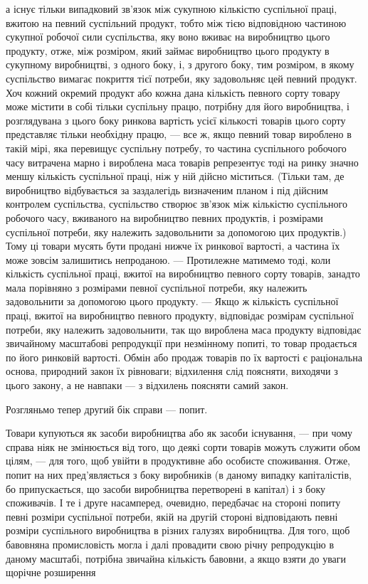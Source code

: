 \enlargethispage{\baselineskip}
\parcont{}  %
а існує тільки випадковий зв’язок між сукупною кількістю суспільної
праці, вжитою на певний суспільний продукт, тобто між
тією відповідною частиною сукупної робочої сили суспільства,
яку воно вживає на виробництво цього продукту, отже, між
розміром, який займає виробництво цього продукту в сукупному
виробництві, з одного боку, і, з другого боку, тим розміром, в якому
суспільство вимагає покриття тієї потреби, яку задовольняє цей
певний продукт. Хоч кожний окремий продукт або кожна дана кількість
певного сорту товару може містити в собі тільки суспільну
працю, потрібну для його виробництва, і розглядувана з цього
боку ринкова вартість усієї кількості товарів цього сорту представляє
тільки необхідну працю, — все ж, якщо певний товар
вироблено в такій мірі, яка перевищує суспільну потребу, то
частина суспільного робочого часу витрачена марно і вироблена
маса товарів репрезентує тоді на ринку значно меншу
кількість суспільної праці, ніж у ній дійсно міститься. (Тільки
там, де виробництво відбувається за заздалегідь визначеним
планом і під дійсним контролем суспільства, суспільство створює
зв’язок між кількістю суспільного робочого часу, вживаного на виробництво
певних продуктів, і розмірами суспільної потреби, яку
належить задовольнити за допомогою цих продуктів.) Тому ці товари
мусять бути продані нижче їх ринкової вартості, а частина їх
може зовсім залишитись непроданою. — Протилежне матимемо тоді,
коли кількість суспільної праці, вжитої на виробництво певного
сорту товарів, занадто мала порівняно з розмірами певної суспільної
потреби, яку належить задовольнити за допомогою цього продукту.
— Якщо ж кількість суспільної праці, вжитої на виробництво
певного продукту, відповідає розмірам суспільної потреби, яку
належить задовольнити, так що вироблена маса продукту відповідає
звичайному масштабові репродукції при незмінному
попиті, то товар продається по його ринковій вартості. Обмін
або продаж товарів по їх вартості є раціональна основа, природний
закон їх рівноваги; відхилення слід поясняти, виходячи
з цього закону, а не навпаки — з відхилень поясняти самий закон.

Розгляньмо тепер другий бік справи — попит.

Товари купуються як засоби виробництва або як засоби
існування, — при чому справа ніяк не змінюється від того, що
деякі сорти товарів можуть служити обом цілям, — для того,
щоб увійти в продуктивне або особисте споживання. Отже,
попит на них пред’являється з боку виробників (в даному випадку
капіталістів, бо припускається, що засоби виробництва
перетворені в капітал) і з боку споживачів. І те і друге насамперед,
очевидно, передбачає на стороні попиту певні розміри
суспільної потреби, якій на другій стороні відповідають певні
розміри суспільного виробництва в різних галузях виробництва.
Для того, щоб бавовняна промисловість могла і далі провадити
свою річну репродукцію в даному масштабі, потрібна звичайна
кількість бавовни, а якщо взяти до уваги щорічне розширення
\parbreak{}  %
